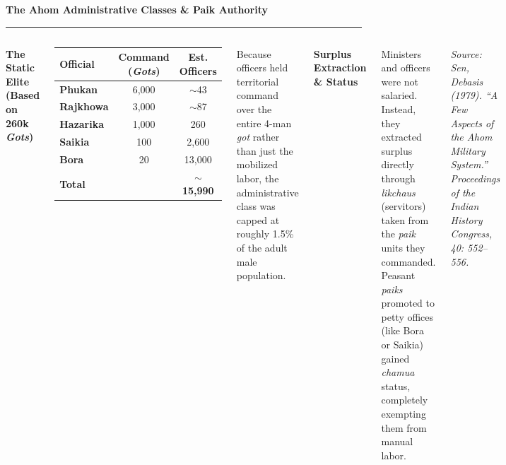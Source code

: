 \documentclass[aspectratio=169, 10pt]{beamer}
\newcommand{\slidetitle}[1]{%
  \vspace{-4pt}%
  {\usebeamerfont{frametitle}\Large\color{ink}\textbf{#1}}%
  \par\vspace{2pt}%
  {\color{clay}\rule{40pt}{2pt}}%
  \par\vspace{8pt}%
}
\newcommand{\thesisbox}[2]{%
  \begin{minipage}{\textwidth}
    {\bfseries\color{rust}#1}\par\vspace{4pt}%
    \color{ink}#2
  \end{minipage}\par
}
\begin{document}
\begin{frame}
\slidetitle{The Ahom Administrative Classes \& Paik Authority}

\begin{columns}[T]
\textbf{\color{rust}The Static Elite (Based on 260k \textit{Gots})}

\vspace{6pt}
\begin{center}
\small
{}
\begin{tabular}{@{}lcc@{}}
\arrayrulecolor{warmgray}
\toprule
\textbf{Official} & \textbf{Command (\textit{Gots})} & \textbf{Est. Officers} \\
\midrule
\textbf{Phukan} & 6,000 & $\sim$43 \\
\textbf{Rajkhowa} & 3,000 & $\sim$87 \\
\textbf{Hazarika} & 1,000 & 260 \\
\textbf{Saikia} & 100 & 2,600 \\
\textbf{Bora} & 20 & 13,000 \\
\midrule
\textbf{Total} & & \textbf{$\sim$15,990} \\
\bottomrule
\end{tabular}
\end{center}

\vspace{6pt}
{\small\color{slate}Because officers held territorial command over the entire 4-man \textit{got} rather than just the mobilized labor, the administrative class was capped at roughly 1.5\% of the adult male population.}

\thesisbox{Surplus Extraction \& Status}{%
  Ministers and officers were not salaried. Instead, they extracted surplus directly through \textit{likchaus} (servitors) taken from the \textit{paik} units they commanded. Peasant \textit{paiks} promoted to petty offices (like Bora or Saikia) gained \textit{chamua} status, completely exempting them from manual labor.
}

\vspace{8pt}
{\footnotesize\textit{\color{slate}Source: Sen, Debasis (1979). ``A Few Aspects of the Ahom Military System.'' \textit{Proceedings of the Indian History Congress}, 40: 552--556.}}
\end{columns}
\end{frame}
\end{document}
